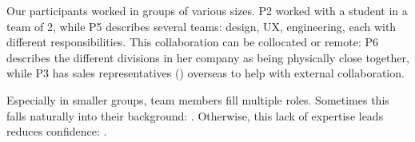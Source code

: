 \begin{quote}
\end{quote}

Our participants worked in groups of various sizes.
P2 worked with a student in a team of 2, while P5 describes several teams: design, UX, engineering, each with different responsibilities.
This collaboration can be collocated or remote: P6 describes the different divisions in her company as being physically close together, while P3 has sales representatives () overseas to help with external collaboration.

Especially in smaller groups, team members fill multiple roles.
Sometimes this falls naturally into their background:
.
Otherwise, this lack of expertise leads reduces confidence:
.








